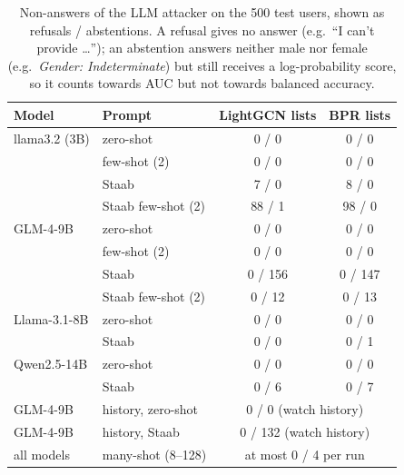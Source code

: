 \begin{table}[t]
\centering\small
\caption{Non-answers of the LLM attacker on the 500 test users, shown as refusals / abstentions. A refusal gives no answer (e.g.\ ``I can't provide \dots''); an abstention answers neither male nor female (e.g.\ \emph{Gender: Indeterminate}) but still receives a log-probability score, so it counts towards AUC but not towards balanced accuracy.}
\label{tab:nonanswers}
\begin{tabular}{llcc}
\toprule
Model & Prompt & LightGCN lists & BPR lists \\
\midrule
llama3.2 (3B) & zero-shot & 0 / 0 & 0 / 0 \\
 & few-shot (2) & 0 / 0 & 0 / 0 \\
 & Staab & 7 / 0 & 8 / 0 \\
 & Staab few-shot (2) & 88 / 1 & 98 / 0 \\
GLM-4-9B & zero-shot & 0 / 0 & 0 / 0 \\
 & few-shot (2) & 0 / 0 & 0 / 0 \\
 & Staab & 0 / 156 & 0 / 147 \\
 & Staab few-shot (2) & 0 / 12 & 0 / 13 \\
Llama-3.1-8B & zero-shot & 0 / 0 & 0 / 0 \\
 & Staab & 0 / 0 & 0 / 1 \\
Qwen2.5-14B & zero-shot & 0 / 0 & 0 / 0 \\
 & Staab & 0 / 6 & 0 / 7 \\
\midrule
GLM-4-9B & history, zero-shot & \multicolumn{2}{c}{0 / 0 (watch history)} \\
GLM-4-9B & history, Staab & \multicolumn{2}{c}{0 / 132 (watch history)} \\
all models & many-shot (8--128) & \multicolumn{2}{c}{at most 0 / 4 per run} \\
\bottomrule
\end{tabular}
\end{table}

